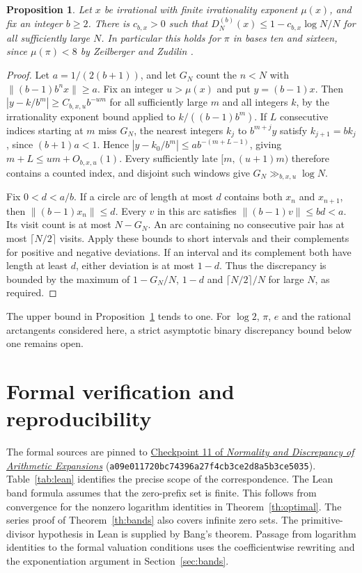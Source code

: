 \documentclass[11pt]{article}
\newtheorem{proposition}[theorem]{Proposition}
\begin{document}
\begin{proposition}\label{prop:pi-gap}
Let $x$ be irrational with finite irrationality exponent $\mu(x)$, and fix an integer $b\ge2$. There is $c_{b,x}>0$ such that $D_N^{(b)}(x)\le1-c_{b,x}\log N/N$ for all sufficiently large $N$. In particular this holds for $\pi$ in bases ten and sixteen, since $\mu(\pi)<8$ by Zeilberger and Zudilin \cite{zz}.
\end{proposition}
\begin{proof}
Let $a=1/(2(b+1))$, and let $G_N$ count the $n<N$ with $\|(b-1)b^nx\|\ge a$. Fix an integer $u>\mu(x)$ and put $y=(b-1)x$. Then $|y-k/b^m|\ge C_{b,x,u} b^{-um}$ for all sufficiently large $m$ and all integers $k$, by the irrationality exponent bound applied to $k/((b-1)b^m)$.
If $L$ consecutive indices starting at $m$ miss $G_N$, the nearest integers
$k_j$ to $b^{m+j}y$ satisfy $k_{j+1}=bk_j$, since $(b+1)a<1$.
Hence $|y-k_0/b^m|\le a b^{-(m+L-1)}$, giving $m+L\le um+O_{b,x,u}(1)$.
Every sufficiently late $[m,(u+1)m)$ therefore contains a counted index, and
disjoint such windows give $G_N\gg_{b,x,u}\log N$.

Fix $0<d<a/b$. If a circle arc of length at most $d$ contains both $x_n$
and $x_{n+1}$, then $\|(b-1)x_n\|\le d$. Every $v$ in this arc satisfies
$\|(b-1)v\|\le bd<a$. Its visit count is at most $N-G_N$. An arc containing
no consecutive pair has at most $\lceil N/2\rceil$ visits. Apply these bounds
to short intervals and their complements for positive and negative deviations.
If an interval and its complement both have length at least $d$, either
deviation is at most $1-d$. Thus the discrepancy is bounded by the maximum
of $1-G_N/N$, $1-d$ and $\lceil N/2\rceil/N$ for large $N$, as required.
\end{proof}
The upper bound in Proposition~\ref{prop:pi-gap} tends to one. For $\log 2$, $\pi$, $e$ and the rational arctangents considered here, a strict asymptotic binary discrepancy bound below one remains open.

\section{Formal verification and reproducibility}
The formal sources are pinned to
\href{https://github.com/eldernos/MathematicsResearch/tree/a09e011720bc74396a27f4cb3ce2d8a5b3ce5035}{Checkpoint 11 of \emph{Normality and Discrepancy of Arithmetic Expansions}}
(\texttt{a09e011720bc74396a27f4cb3ce2d8a5b3ce5035}).
Table~\ref{tab:lean} identifies the precise scope of the correspondence.
The Lean band formula assumes that the zero-prefix set is finite. This follows
from convergence for the nonzero logarithm identities in
Theorem~\ref{th:optimal}. The series proof of Theorem~\ref{th:bands} also
covers infinite zero sets. The primitive-divisor hypothesis in Lean is
supplied by Bang's theorem. Passage from logarithm identities to the formal valuation conditions uses the coefficientwise rewriting and the exponentiation argument in Section~\ref{sec:bands}.
\end{document}
